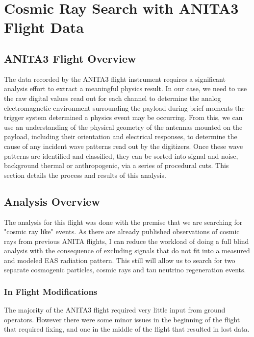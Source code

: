 \chapter{Cosmic Ray Search with ANITA3 Flight Data}
\section{ANITA3 Flight Overview}
	The data recorded by the ANITA3 flight instrument requires a significant analysis effort to extract a meaningful physics result.  In our case, we need to use the raw digital values read out for each channel to determine the analog electromagnetic environment surrounding the payload during brief moments the trigger system determined a physics event may be occurring.  From this, we can use an understanding of the physical geometry of the antennas mounted on the payload, including their orientation and electrical responses, to determine the cause of any incident wave patterns read out by the digitizers.  Once these wave patterns are identified and classified, they can be sorted into signal and noise, background thermal or anthropogenic, via a series of procedural cuts.  This section details the process and results of this analysis.
	
\section{Analysis Overview}
	The analysis for this flight was done with the premise that we are searching for "cosmic ray like" events.  As there are already published observations of cosmic rays from previous ANITA flights, I can reduce the workload of doing a full blind analysis with the consequence of excluding signals that do not fit into a measured and modeled EAS radiation pattern.  This still will allow us to search for two separate cosmogenic particles, cosmic rays and tau neutrino regeneration events.

	\subsection{In Flight Modifications}
		The majority of the ANITA3 flight required very little input from ground operators.  However there were some minor issues in the beginning of the flight that required fixing, and one in the middle of the flight that resulted in lost data.
		
